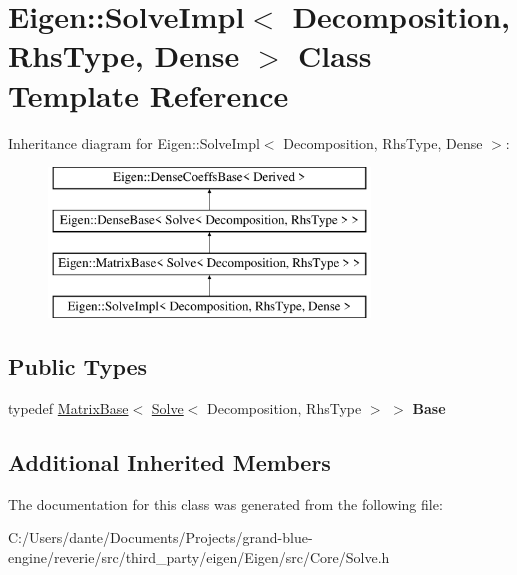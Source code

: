 \hypertarget{class_eigen_1_1_solve_impl_3_01_decomposition_00_01_rhs_type_00_01_dense_01_4}{}\section{Eigen\+::Solve\+Impl$<$ Decomposition, Rhs\+Type, Dense $>$ Class Template Reference}
\label{class_eigen_1_1_solve_impl_3_01_decomposition_00_01_rhs_type_00_01_dense_01_4}
Inheritance diagram for Eigen\+::Solve\+Impl$<$ Decomposition, Rhs\+Type, Dense $>$\+:\begin{figure}[H]
\begin{center}
\leavevmode
\includegraphics[height=4.000000cm]{class_eigen_1_1_solve_impl_3_01_decomposition_00_01_rhs_type_00_01_dense_01_4}
\end{center}
\end{figure}
\subsection*{Public Types}
\begin{DoxyCompactItemize}
\item 
\mbox{\label{class_eigen_1_1_solve_impl_3_01_decomposition_00_01_rhs_type_00_01_dense_01_4_a8eb3f85f9e23106fe847ba4a0996c329}} 
typedef \mbox{\hyperlink{class_eigen_1_1_matrix_base}{Matrix\+Base}}$<$ \mbox{\hyperlink{class_eigen_1_1_solve}{Solve}}$<$ Decomposition, Rhs\+Type $>$ $>$ {\bfseries Base}
\end{DoxyCompactItemize}
\subsection*{Additional Inherited Members}


The documentation for this class was generated from the following file\+:\begin{DoxyCompactItemize}
\item 
C\+:/\+Users/dante/\+Documents/\+Projects/grand-\/blue-\/engine/reverie/src/third\+\_\+party/eigen/\+Eigen/src/\+Core/Solve.\+h\end{DoxyCompactItemize}
